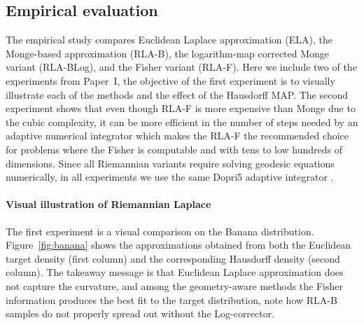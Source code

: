\subsection*{Empirical evaluation}
The empirical study compares Euclidean Laplace approximation (ELA), the Monge-based approximation (RLA-B), the logarithm-map corrected Monge variant (RLA-BLog), and the Fisher variant (RLA-F).
Here we include two of the experiments from Paper~I, the objective of the first experiment is to visually illustrate each of the methods and the effect of the Hausdorff MAP. The second experiment shows that even though RLA-F is more expensive than Monge due to the cubic complexity, it can be more efficient in the number of steps needed by an adaptive numerical integrator which makes the RLA-F the recommended choice for problems where the Fisher is computable and with tens to low hundreds of dimensions. Since all Riemannian variants require solving geodesic equations numerically, in all experiments we use the same Dopri5 adaptive integrator \citep{kidger2022neural}.

\paragraph{Visual illustration of Riemannian Laplace}
The first experiment is a visual comparison on the Banana distribution. Figure~\ref{fig:banana} shows the approximations obtained from both the Euclidean target density (first column) and the corresponding Hausdorff density (second column).
The takeaway message is that Euclidean Laplace approximation does not capture the curvature, and among the geometry-aware methods the Fisher information produces the best fit to the target distribution, note how RLA-B samples do not properly spread out  without the Log-corrector.

